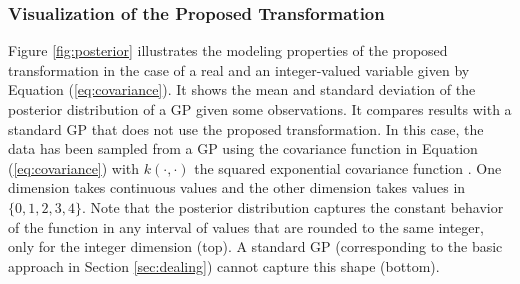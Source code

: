 \subsubsection{Visualization of the Proposed Transformation} \label{sec:visual}

Figure \ref{fig:posterior} illustrates the modeling properties of the proposed transformation in the case of a real
and an integer-valued variable given by Equation (\ref{eq:covariance}). It shows the mean and standard deviation of the posterior
distribution of a GP given some observations. It compares results with a standard GP that does not use the proposed
transformation. In this case, the data has been sampled from a GP using the covariance function in Equation (\ref{eq:covariance})
with $k(\cdot,\cdot)$ the squared exponential covariance function \citep{rasmussen2003gaussian}. One dimension takes continuous
values and the other dimension takes values in $\{0,1,2,3,4\}$. Note that the posterior distribution captures the constant
behavior of the function in any interval of values that are rounded to the same integer, only for the integer
dimension (top). A standard GP (corresponding to the basic approach in Section \ref{sec:dealing}) cannot capture
this shape (bottom).

